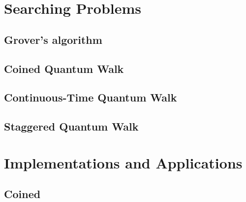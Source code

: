 \documentclass[
oneside,
11pt, a4paper,
footinclude=true,
headinclude=true,
cleardoublepage=empty
]{scrbook}
\begin{document}
\chapter{Searching Problems}\label{chap:searchingProblems}
\section{Grover's algorithm}

\section{Coined Quantum Walk}

\section{Continuous-Time Quantum Walk}

\section{Staggered Quantum Walk}



\chapter{Implementations and Applications}\label{chap:qiskitImplementation}
\section{Coined}\label{coinedQWQiskit}

\end{document}
